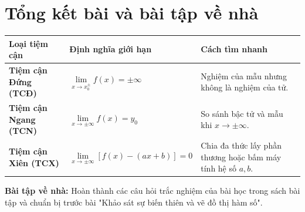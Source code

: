 \documentclass[12pt]{article}
\begin{document}
	\section{Tổng kết bài và bài tập về nhà}
	
	\begin{tcolorbox}[colback=orange!10!white, colframe=orange!80!black,
		fonttitle=\bfseries, title={Bảng tóm tắt công thức tìm nhanh Tiệm cận}]
		\renewcommand{\arraystretch}{1.3}
		\begin{tabular}{p{4cm} p{6cm} p{6cm}}
			\textbf{Loại tiệm cận} & \textbf{Định nghĩa giới hạn} & \textbf{Cách tìm nhanh} \\
			\hline
			\textbf{Tiệm cận Đứng (TCĐ)} & $\lim\limits_{x \to x_0^{\pm}} f(x) = \pm\infty$ & Nghiệm của mẫu nhưng không là nghiệm của tử. \\
			\textbf{Tiệm cận Ngang (TCN)} & $\lim\limits_{x \to \pm\infty} f(x) = y_0$ & So sánh bậc tử và mẫu khi $x \to \pm\infty$. \\
			\textbf{Tiệm cận Xiên (TCX)} & $\lim\limits_{x \to \pm\infty} [f(x) - (ax+b)] = 0$ & Chia đa thức lấy phần thương hoặc bấm máy tính hệ số $a, b$. \\
		\end{tabular}
	\end{tcolorbox}
	
	\vspace{3mm}
	\textbf{Bài tập về nhà:} Hoàn thành các câu hỏi trắc nghiệm của bài học trong sách bài tập và chuẩn bị trước bài "Khảo sát sự biến thiên và vẽ đồ thị hàm số".
	
\end{document}
